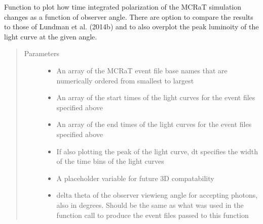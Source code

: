 \documentclass[letterpaper,10pt,english]{sphinxmanual}
\begin{document}
\begin{fulllineitems}
\label{\detokenize{read_process_files:read_process_files.polarizationVsAngle}}
Function to plot how time integrated polarization of the MCRaT simulation changes as a function of observer angle.
There are option to compare the results to those of Lundman et al. (2014b) and to also overplot the peak luminoity
of the light curve at the given angle.
\begin{quote}\begin{description}
\item[{Parameters}] \leavevmode\begin{itemize}
\item {} 
 \textendash{} An array of the MCRaT event file base names that are numerically ordered from smallest to largest

\item {} 
 \textendash{} An array of the start times of the light curves for the event files specified above

\item {} 
 \textendash{} An array of the end times of the light curves for the event files specified above

\item {} 
 \textendash{} If also plotting the peak of the light curve, dt specifies the width of the time bins of the light curves

\item {} 
 \textendash{} A placeholder variable for future 3D compatability

\item {} 
 \textendash{} delta theta of the observer viewieng angle for accepting photons, also in degrees.
Should be the same as what was used in the function call to produce the event files passed to this function


\end{itemize}
\end{description}
\end{quote}
\end{fulllineitems}
\end{document}
